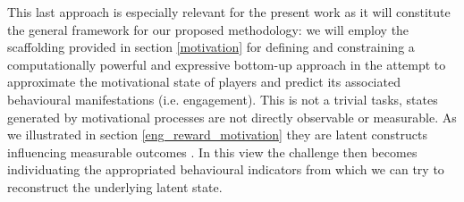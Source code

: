 This last approach is especially relevant for the present work as it will constitute the general framework for our proposed methodology: we will employ the scaffolding provided in section \ref{motivation} for defining and constraining a computationally powerful and expressive bottom-up approach in the attempt to approximate the motivational state of players and predict its associated behavioural manifestations (i.e. engagement). This is not a trivial tasks, states generated by motivational processes are not directly observable or measurable. As we illustrated in section \ref{eng_reward_motivation} they are latent constructs influencing measurable outcomes \cite{yannakakis2007game, bauckhage2012players}. In this view the challenge then becomes individuating the appropriated behavioural indicators from which we can try to reconstruct the underlying latent state. 

